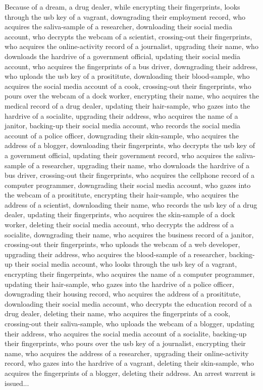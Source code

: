 \documentclass{report}
\begin{document}
Because of a dream, a drug dealer, while encrypting their fingerprints, looks through the usb key of a vagrant, downgrading their employment record, who acquires the saliva-sample of a researcher, downloading their social media account, who decrypts the webcam of a scientist, crossing-out their fingerprints, who acquires the online-activity record of a journalist, upgrading their name, who downloads the hardrive of a government official, updating their social media account, who acquires the fingerprints of a bus driver, downgrading their address, who uploads the usb key of a prosititute, downloading their blood-sample, who acquires the social media account of a cook, crossing-out their fingerprints, who pours over the webcam of a dock worker, encrypting their name, who acquires the medical record of a drug dealer, updating their hair-sample, who gazes into the hardrive of a socialite, upgrading their address, who acquires the name of a janitor, backing-up their social media account, who records the social media account of a police officer, downgrading their skin-sample, who acquires the address of a blogger, downloading their fingerprints, who decrypts the usb key of a government official, updating their government record, who acquires the saliva-sample of a researcher, upgrading their name, who downloads the hardrive of a bus driver, crossing-out their fingerprints, who acquires the cellphone record of a computer programmer, downgrading their social media account, who gazes into the webcam of a prosititute, encrypting their hair-sample, who acquires the address of a scientist, downloading their name, who records the usb key of a drug dealer, updating their fingerprints, who acquires the skin-sample of a dock worker, deleting their social media account, who decrypts the address of a socialite, downgrading their name, who acquires the business record of a janitor, crossing-out their fingerprints, who uploads the webcam of a web developer, upgrading their address, who acquires the blood-sample of a researcher, backing-up their social media account, who looks through the usb key of a vagrant, encrypting their fingerprints, who acquires the name of a computer programmer, updating their hair-sample, who gazes into the hardrive of a police officer, downgrading their housing record, who acquires the address of a prosititute, downloading their social media account, who decrypts the education record of a drug dealer, deleting their name, who acquires the fingerprints of a cook, crossing-out their saliva-sample, who uploads the webcam of a blogger, updating their address, who acquires the social media account of a socialite, backing-up their fingerprints, who pours over the usb key of a journalist, encrypting their name, who acquires the address of a researcher, upgrading their online-activity record, who gazes into the hardrive of a vagrant, deleting their skin-sample, who acquires the fingerprints of a blogger, deleting their address. An arrest warrent is issued...
\end{document}
